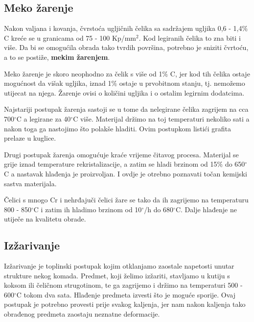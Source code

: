 \documentclass[a4paper,12pt]{article}
\numberwithin{figure}{section}
\begin{document}
\subsection{Meko žarenje}
Nakon valjana i kovanja, čvrstoća ugljičnih čelika sa sadržajem ugljika 0,6 - 1,4$\%$C kreće se u granicama od 75 - 100 Kp/mm$^{2}$. Kod legiranih čelika to zna biti i više. Da bi se omogućila obrada tako tvrdih površina, potrebno je sniziti čvrtoću, a to se postiže, \textbf{mekim žarenjem}.\par
Meko žarenje je skoro neophodno za čelik s više od 1$\%$ C, jer kod tih čelika ostaje mogućnost da višak ugljika, iznad 1$\%$ ostaje u prvobitnom stanju, tj. nemožemo utijecat na njega. Žarenje ovisi o količini ugljika i o ostalim legirnim dodatcima.\par 
Najstariji postupak žarenja sastoji se u tome da nelegirane čelika zagrijem na cca 700$^{\circ}$C a legirane za 40$^{\circ}$C više. Materijal držimo na toj temperaturi nekoliko sati a nakon toga ga nastojimo što polakše hladiti. Ovim postupkom listići grafita prelaze u kuglice. \par
Drugi postupak žarenja omogućuje kraće vrijeme čitavog procesa. Materijal se grije iznad temperature rekristalizacije, a zatim se hladi brzinom od 15$\%$ do 650$^{\circ}$C a nastavak hlađenja je proizvoljan. I ovdje je otrebno poznavati točan kemijski sastva materijala.\par
Čelici s mnogo Cr i nehrđajuči čelici žare se tako da ih zagrijemo na temperaturu 800 - 850$^{\circ}$C  i zatim ih hladimo brzinom od 10$^{\circ}$/h do 680$^{\circ}$C. Dalje hlađenje ne utiječe na kvalitetu obrade.
\subsection{Izžarivanje}
Izžarivanje je toplinski postupak kojim otklanjamo zaostale napetosti unutar strukture nekog komada. Predmet, koji želimo izžariti, stavljamo u kutiju s koksom ili čeličnom strugotinom, te ga zagrijemo i držimo na temperaturi 500 - 600$^{\circ}$C  tokom dva sata. Hlađenje predmeta izvesti što je moguće sporije. Ovaj postupak je potrebno provesti prije svakog kaljenja, jer nam nakon kaljenja tako obrađenog predmeta zaostaju neznatne deformacije.
\end{document}
